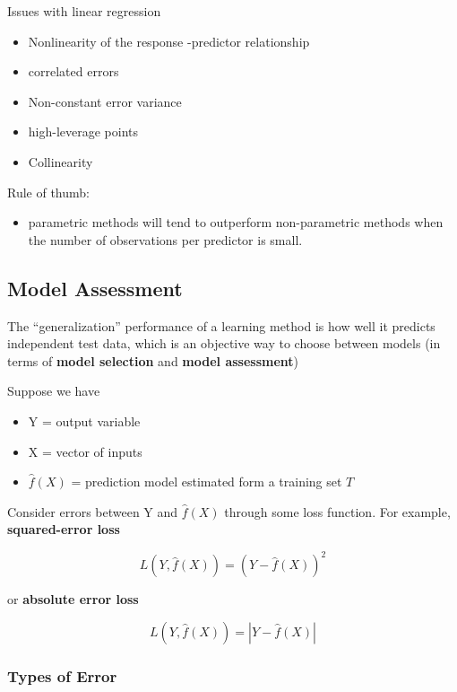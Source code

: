 \documentclass[
]{book}
\providecommand{\tightlist}{%
  \setlength{\itemsep}{0pt}\setlength{\parskip}{0pt}}
\begin{document}
Issues with linear regression

\begin{itemize}
\item
  Nonlinearity of the response -predictor relationship
\item
  correlated errors
\item
  Non-constant error variance
\item
  high-leverage points
\item
  Collinearity
\end{itemize}

Rule of thumb:

\begin{itemize}
\tightlist
\item
  parametric methods will tend to outperform non-parametric methods when the number of observations per predictor is small.
\end{itemize}

\hypertarget{model-assessment}{%
\subsection{Model Assessment}\label{model-assessment}}

The ``generalization'' performance of a learning method is how well it predicts independent test data, which is an objective way to choose between models (in terms of \textbf{model selection} and \textbf{model assessment})

Suppose we have

\begin{itemize}
\item
  Y = output variable
\item
  X = vector of inputs
\item
  \(\hat{f}(X)\) = prediction model estimated form a training set \(T\)
\end{itemize}

Consider errors between Y and \(\hat{f}(X)\) through some loss function. For example, \textbf{squared-error loss}

\[
L(Y, \hat{f}(X)) = (Y- \hat{f}(X))^2
\]

or \textbf{absolute error loss}

\[
L(Y, \hat{f}(X)) = |Y- \hat{f}(X)|
\]

\hypertarget{types-of-error}{%
\subsubsection{Types of Error}\label{types-of-error}}
\end{document}
